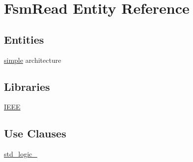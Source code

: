 \hypertarget{class_fsm_read}{}\section{Fsm\+Read Entity Reference}
\label{class_fsm_read}
\subsection*{Entities}
\begin{DoxyCompactItemize}
\item 
\hyperlink{class_fsm_read_1_1simple}{simple} architecture
\end{DoxyCompactItemize}
\subsection*{Libraries}
 \begin{DoxyCompactItemize}
\item 
\hyperlink{class_fsm_read_ae4f03c286607f3181e16b9aa12d0c6d4}{I\+E\+E\+E} 
\end{DoxyCompactItemize}
\subsection*{Use Clauses}
 \begin{DoxyCompactItemize}
\item 
\hyperlink{class_fsm_read_acd03516902501cd1c7296a98e22c6fcb}{std\+\_\+logic\+\_}   
\end{DoxyCompactItemize}

